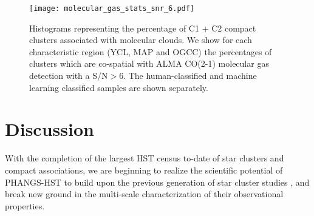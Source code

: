\documentclass[linenumbers]{aastex63}
\begin{document}









%

%
%
\begin{figure} 
\texttt{[image: molecular\_gas\_stats\_snr\_6.pdf]}
\caption{Histograms representing the percentage of C1 + C2 compact clusters associated with molecular clouds. We show for each characteristic region (YCL, MAP and OGCC) the percentages of clusters which are co-spatial with ALMA CO(2-1) molecular gas detection with a S/N$>6$. The human-classified and machine learning classified samples are shown separately.}
 \label{fig:dist_gmc}
\end{figure}
%
\section{Discussion}\label{sect:discussion}

With the completion of the largest HST census to-date of star clusters and compact associations, we are beginning to realize the scientific potential of PHANGS-HST to build upon the previous generation of star cluster studies \citep[e.g.,][and references therein]{portegies_zwart_young_2010, renaud_star_2018, krumholz_star_2019, adamo20}, and break new ground in the multi-scale characterization of their observational properties.  
\end{document}
